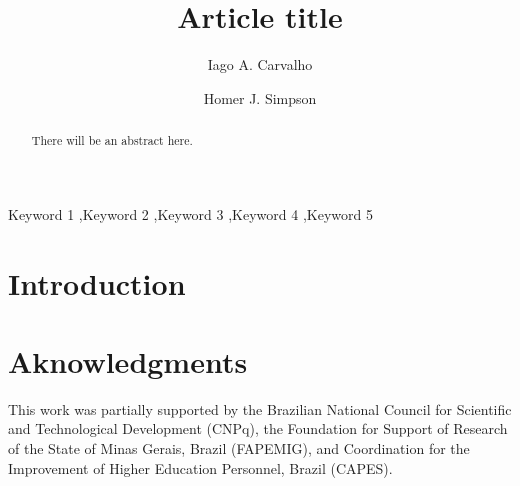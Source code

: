 \documentclass[preprint,review,12pt]{elsarticle}
\begin{document}
\begin{frontmatter}

            
\title{Article title}


\author[label1]{Iago A. Carvalho}

\author[label2]{Homer J. Simpson}

\address[label1]{Department of Computer Science, Universidade Federal de Minas Gerais}


\address[label2]{Twenty Century Fox, USA}

\begin{abstract}
There will be an abstract here.
\end{abstract}

\begin{keyword}
Keyword 1 \sep Keyword 2 \sep Keyword 3 \sep Keyword 4 \sep Keyword 5
\end{keyword}

\end{frontmatter}



\section{Introduction} \label{sec:intro}



\section*{Aknowledgments}
This work was partially supported by the Brazilian National Council for Scientific and Technological Development (CNPq), the Foundation for Support of Research of the State of Minas Gerais, Brazil (FAPEMIG), and Coordination for the Improvement of Higher Education Personnel, Brazil (CAPES).



% 
% 
% 
% 
% 
% 
% 
% 
% 
% 
% 
% 


\end{document}
